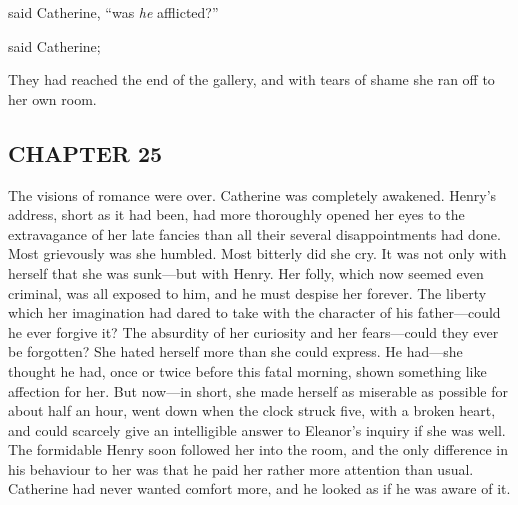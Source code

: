  said Catherine, “was {\em he} afflicted?”


 said Catherine; 


They had reached the end of the gallery, and with tears of shame she ran off to her own room.

\subsection[chapter-25]{\useURL[url27][][][]\from[url27]CHAPTER 25}

The visions of romance were over. Catherine was completely awakened. Henry's address, short as it had been, had more thoroughly opened her eyes to the extravagance of her late fancies than all their several disappointments had done. Most grievously was she humbled. Most bitterly did she cry. It was not only with herself that she was sunk---but with Henry. Her folly, which now seemed even criminal, was all exposed to him, and he must despise her forever. The liberty which her imagination had dared to take with the character of his father---could he ever forgive it? The absurdity of her curiosity and her fears---could they ever be forgotten? She hated herself more than she could express. He had---she thought he had, once or twice before this fatal morning, shown something like affection for her. But now---in short, she made herself as miserable as possible for about half an hour, went down when the clock struck five, with a broken heart, and could scarcely give an intelligible answer to Eleanor's inquiry if she was well. The formidable Henry soon followed her into the room, and the only difference in his behaviour to her was that he paid her rather more attention than usual. Catherine had never wanted comfort more, and he looked as if he was aware of it.

